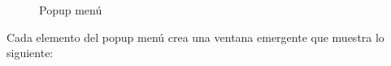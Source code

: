 \documentclass[12pt, a4paper]{article}
\begin{document}
	
	\begin{figure}[htbp]
		\centering
		\caption{Popup menú} \label{fig:menucartera}
	\end{figure}

Cada elemento del popup menú crea una ventana emergente que muestra lo siguiente:
\end{document}
